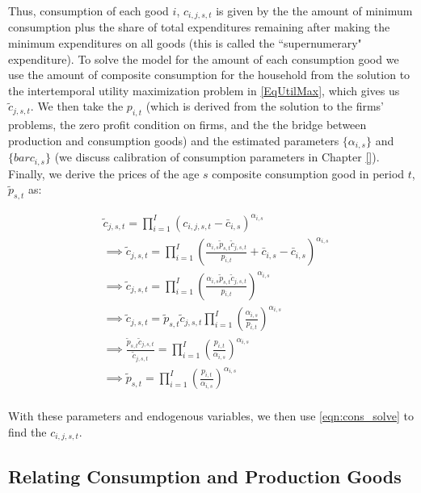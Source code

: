     Thus, consumption of each good $i$, $c_{i,j,s,t}$ is given by the the amount of minimum consumption plus the share of total expenditures remaining after making the minimum expenditures on all goods (this is called the ``supernumerary" expenditure).  To solve the model for the amount of each consumption good we use the amount of composite consumption for the household from the solution to the intertemporal utility maximization problem in \ref{EqUtilMax}, which gives us $\tilde{c}_{j,s,t}$. We then take the $p_{i,t}$ (which is derived from the solution to the firms' problems, the zero profit condition on firms, and the the bridge between production and consumption goods) and the estimated parameters $\{\alpha_{i,s}\}$ and $\{bar{c}_{i,s}\}$ (we discuss calibration of consumption parameters in Chapter \ref{}).  Finally, we derive the prices of the age $s$ composite consumption good in period $t$, $\tilde{p}_{s,t}$ as: 
    
              \begin{equation} \label{eqn:composite_price}
      \begin{split}
      & \tilde{c}_{j,s,t} = \prod_{i=1}^{I}(c_{i,j,s,t}-\bar{c}_{i,s})^{\alpha_{i,s}} \\
      &\implies \tilde{c}_{j,s,t} = \prod_{i=1}^{I}\left( \frac{\alpha_{i,s} \tilde{p}_{s,t}\tilde{c}_{j,s,t}}{p_{i,t}} + \bar{c}_{i,s}-\bar{c}_{i,s}\right)^{\alpha_{i,s}} \\
      &\implies \tilde{c}_{j,s,t} = \prod_{i=1}^{I} \left( \frac{\alpha_{i,s} \tilde{p}_{s,t}\tilde{c}_{j,s,t}}{p_{i,t}} \right)^{\alpha_{i,s}} \\
      &\implies \tilde{c}_{j,s,t} =  \tilde{p}_{s,t}\tilde{c}_{j,s,t} \prod_{i=1}^{I}\left( \frac{\alpha_{i,s}}{p_{i,t}} \right)^{\alpha_{i,s}} \\
      &\implies \frac{\tilde{p}_{s,t}\tilde{c}_{j,s,t}}{\tilde{c}_{j,s,t}} =  \prod_{i=1}^{I}\left( \frac{p_{i,t}}{\alpha_{i,s}} \right)^{\alpha_{i,s}} \\
       &\implies \tilde{p}_{s,t} =  \prod_{i=1}^{I}\left( \frac{p_{i,t}}{\alpha_{i,s}} \right)^{\alpha_{i,s}} \\
       \end{split}
    \end{equation}
    
    With these parameters and endogenous variables, we then use \ref{eqn:cons_solve} to find the $c_{i,j,s,t}$.
    
    \subsection{Relating Consumption and Production Goods}\label{sec:prod_cons_map}
    
